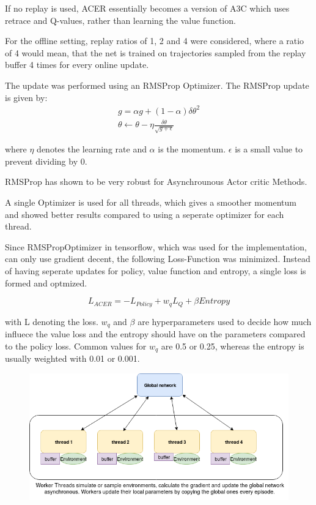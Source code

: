 If no replay is used, ACER essentially becomes a version of A3C which uses retrace and Q-values, rather than learning the value function. \citep{A3C}

For the offline setting, replay ratios of 1, 2 and 4 were considered, where a ratio of 4 would mean, that the net is trained on trajectories sampled from the replay buffer 4 times for every online update.

The update was performed using an RMSProp Optimizer.
The RMSProp update is given by:
\begin{align}
g = \alpha g + (1- \alpha) \delta \theta^2 \\ \theta \gets \theta - \eta \frac{\delta \theta}{ \sqrt{g+\epsilon}}
\end{align}

where $\eta$ denotes the learning rate and $\alpha$ is the momentum. $\epsilon$ is a small value to prevent dividing by 0.

RMSProp has shown to be very robust for Asynchrounous Actor critic Methods. \citep{A3C}

A single Optimizer is used for all threads, which gives a smoother momentum and showed better results compared to using a seperate optimizer for each thread.

Since RMSPropOptimizer in tensorflow, which was used for the implementation, can only use gradient decent, the following Loss-Function was minimized. Instead of having seperate updates for policy, value function and entropy, a single loss is formed and optmized.

\begin{equation}
L_{ACER} = - L_{Policy} + w_q L_{Q} + \beta Entropy
\end{equation}

with L denoting the loss. $w_q$ and $\beta$ are hyperparameters used to decide how much influece the value loss and the entropy should have on the parameters compared to the policy loss. Common values for $w_q$ are 0.5 or 0.25, whereas the entropy is usually weighted with 0.01 or 0.001.

\begin{figure}
\includegraphics[scale=0.5]{bilder/ACERarchitecture.png}
\end{figure}
\pagebreak

